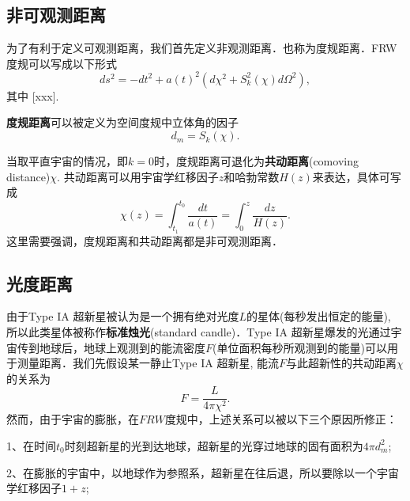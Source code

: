 

\subsection{非可观测距离}
为了有利于定义可观测距离，我们首先定义非观测距离．也称为度规距离．FRW度规可以写成以下形式
\begin{equation}
ds^2=-dt^2+a(t)^2(d\chi^2+S^2_k (\chi) d\Omega^2),
\end{equation}
其中
[xxx].

\textbf{度规距离}可以被定义为空间度规中立体角的因子
\begin{equation}
d_m=S_k(\chi).
\end{equation}

当取平直宇宙的情况，即$k=0$时，度规距离可退化为\textbf{共动距离}(comoving distance)$\chi$. 共动距离可以用宇宙学红移因子$z$和哈勃常数$H(z)$来表达，具体可写成
\begin{equation}
\chi(z)=\int^{t_0}_{t_1} \frac{dt}{a(t)}=\int^z_0 \frac{dz}{H(z)}.
\end{equation}
这里需要强调，度规距离和共动距离都是非可观测距离．

\subsection{光度距离}
由于Type IA 超新星被认为是一个拥有绝对光度$L$的星体(每秒发出恒定的能量), 所以此类星体被称作\textbf{标准烛光}(standard candle)．Type IA 超新星爆发的光通过宇宙传到地球后，地球上观测到的能流密度$F$(单位面积每秒所观测到的能量)可以用于测量距离．我们先假设某一静止Type IA 超新星, 能流$F$与此超新性的共动距离$\chi$的关系为
\begin{equation}
F=\frac{L}{4\pi \chi^2}.
\end{equation}
然而，由于宇宙的膨胀，在$FRW$度规中，上述关系可以被以下三个原因所修正：

1、在时间$t_0$时刻超新星的光到达地球，超新星的光穿过地球的固有面积为$4\pi d_m^2$;

2、在膨胀的宇宙中，以地球作为参照系，超新星在往后退，所以要除以一个宇宙学红移因子$1+z$;